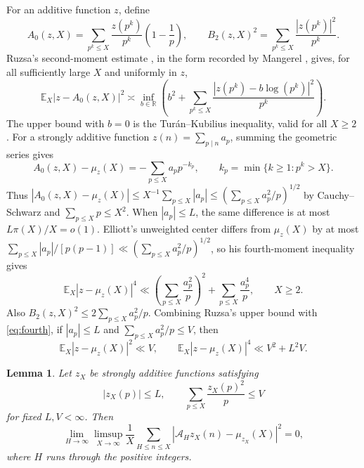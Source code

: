 \documentclass[11pt]{article}
\numberwithin{equation}{section}
\newtheorem{lemma}[theorem]{Lemma}
\newcommand{\R}{\mathbb R}
\newcommand{\E}{\mathbb E}
\begin{document}
For an additive function $z$, define
\[
 A_0(z,X)=\sum_{p^k\le X}\frac{z(p^k)}{p^k}\left(1-\frac1p\right),
 \qquad
 B_2(z,X)^2=\sum_{p^k\le X}\frac{|z(p^k)|^2}{p^k}.
\]
Ruzsa's second-moment estimate \cite{Ruzsa}, in the form recorded by
Mangerel \cite[Lemma~3.3]{Mangerel}, gives, for all sufficiently large $X$
and uniformly in $z$,
\begin{equation}\label{eq:ruzsa}
 \E_X|z-A_0(z,X)|^2
 \asymp\inf_{b\in\R}\left(b^2+
       \sum_{p^k\le X}\frac{|z(p^k)-b\log(p^k)|^2}{p^k}\right).
\end{equation}
The upper bound with $b=0$ is the Tur\'an--Kubilius inequality, valid
for all $X\ge2$ \cite[Ch.~III.3]{Tenenbaum}.
For a strongly additive function $z(n)=\sum_{p\mid n}a_p$, summing
the geometric series gives
\[
 A_0(z,X)-\mu_z(X)=-\sum_{p\le X}a_p p^{-k_p},
 \qquad k_p=\min\{k\ge1:p^k>X\}.
\]
Thus $|A_0(z,X)-\mu_z(X)|\le X^{-1}\sum_{p\le X}|a_p|
\le(\sum_{p\le X}a_p^2/p)^{1/2}$ by Cauchy--Schwarz and
$\sum_{p\le X}p\le X^2$. When $|a_p|\le L$, the same difference
is at most $L\pi(X)/X=o(1)$.
Elliott's unweighted center differs from $\mu_z(X)$ by at most
$\sum_{p\le X}|a_p|/[p(p-1)]\ll(\sum_{p\le X}a_p^2/p)^{1/2}$,
so his fourth-moment inequality \cite[Theorem~1]{Elliott} gives
\begin{equation}\label{eq:fourth}
 \E_X|z-\mu_z(X)|^4
 \ll \left(\sum_{p\le X}\frac{a_p^2}{p}\right)^2
       +\sum_{p\le X}\frac{a_p^4}{p},\qquad X\ge2.
\end{equation}
Also
$B_2(z,X)^2\le2\sum_{p\le X}a_p^2/p$. Combining Ruzsa's upper
bound with \eqref{eq:fourth}, if $|a_p|\le L$ and
$\sum_{p\le X}a_p^2/p\le V$, then
\begin{equation}\label{eq:bounded-moments}
 \E_X|z-\mu_z(X)|^2\ll V,\qquad
 \E_X|z-\mu_z(X)|^4\ll V^2+L^2V.
\end{equation}

\begin{lemma}\label{lem:short}
Let $z_X$ be strongly additive functions satisfying
\[
 |z_X(p)|\le L,\qquad
 \sum_{p\le X}\frac{z_X(p)^2}{p}\le V
\]
for fixed $L,V<\infty$. Then
\begin{equation}\label{eq:short-limit}
 \lim_{H\to\infty}\limsup_{X\to\infty}
 \frac1X\sum_{H\le n\le X}
 |\mathcal A_Hz_X(n)-\mu_{z_X}(X)|^2=0,
\end{equation}
where $H$ runs through the positive integers.
\end{lemma}
\end{document}

